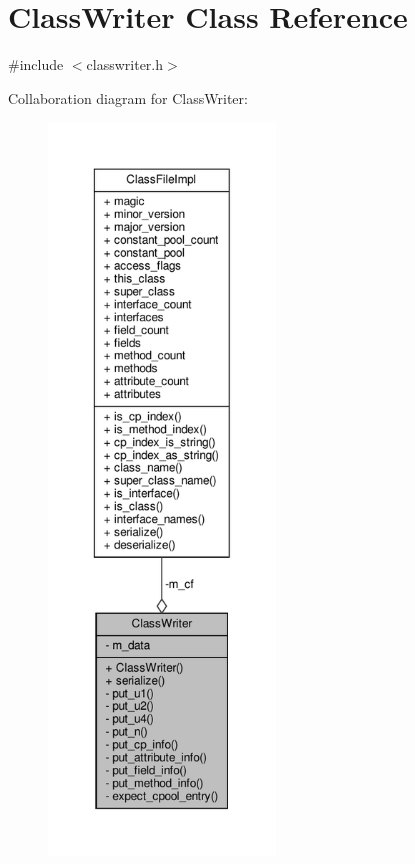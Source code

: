 \hypertarget{classClassWriter}{}\section{Class\+Writer Class Reference}
\label{classClassWriter}


{\ttfamily \#include $<$classwriter.\+h$>$}



Collaboration diagram for Class\+Writer\+:\nopagebreak
\begin{figure}[H]
\begin{center}
\leavevmode
\includegraphics[height=550pt]{classClassWriter__coll__graph}
\end{center}
\end{figure}
